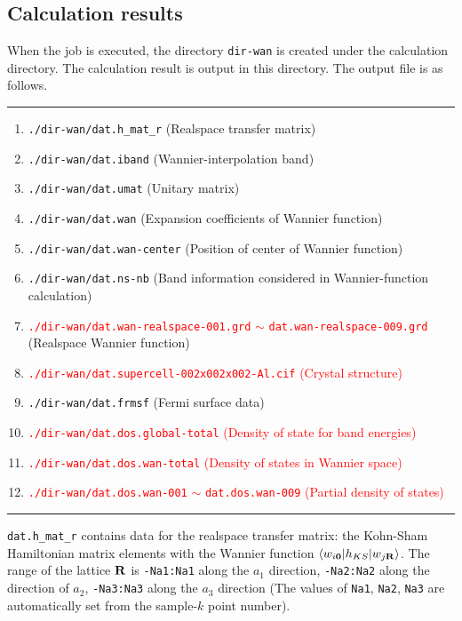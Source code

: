 \documentclass{article}
\newcommand{\tr}[1]{\textcolor{red}{#1}}
\begin{document}
\subsection{\label{result-wannier}Calculation results}
When the job is executed, the directory \verb+dir-wan+ is created under the calculation directory. The calculation result is output in this directory. The output file is as follows.
\vspace{3mm}\hrule
\begin{enumerate}
\item \verb+./dir-wan/dat.h_mat_r+ (Realspace transfer matrix)
\item \verb+./dir-wan/dat.iband+ (Wannier-interpolation band)
\item \verb+./dir-wan/dat.umat+ (Unitary matrix)
\item \verb+./dir-wan/dat.wan+ (Expansion coefficients of Wannier function)
\item \verb+./dir-wan/dat.wan-center+ (Position of center of Wannier function)
\item \verb+./dir-wan/dat.ns-nb+ (Band information considered in Wannier-function calculation)
\item \tr{{\tt ./dir-wan/dat.wan-realspace-001.grd} $\sim$ {\tt dat.wan-realspace-009.grd}} (Realspace Wannier function)
\item \tr{{\tt ./dir-wan/dat.supercell-002x002x002-Al.cif} (Crystal structure)}
\item \verb+./dir-wan/dat.frmsf+ (Fermi surface data)
\item \tr{{\tt ./dir-wan/dat.dos.global-total} (Density of state for band energies)}
\item \tr{{\tt ./dir-wan/dat.dos.wan-total} (Density of states in Wannier space)} 
\item \tr{{\tt ./dir-wan/dat.dos.wan-001} $\sim$ {\tt dat.dos.wan-009} (Partial density of states)}  
\end{enumerate}
\hrule \vspace{3mm}

\verb+dat.h_mat_r+ contains data for the realspace transfer matrix: the Kohn-Sham Hamiltonian matrix elements with the Wannier function $\langle w_{i{\bf 0}}|h_{KS}|w_{j{\bf R}}\rangle$. The range of the lattice ${\bf R}$ is \verb+-Na1:Na1+ along the $a_1$ direction, \verb+-Na2:Na2+ along the direction of $a_2$, \verb+-Na3:Na3+ along the $a_3$ direction (The values of \verb+Na1+, \verb+Na2+, \verb+Na3+ are automatically set from the sample-$k$ point number).
\end{document}
